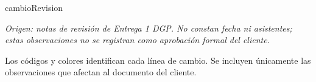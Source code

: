 \newpage
\begin{cambiocontenido}{cambioRevision}
\thispagestyle{empty}

\vspace{0.5em}
\par
\smallskip
{\small\textit{Origen: notas de revisión de Entrega 1 DGP. No constan fecha ni asistentes; estas observaciones no se registran como aprobación formal del cliente.}}\par
\smallskip
{\small Los códigos y colores identifican cada línea de cambio. Se incluyen únicamente las observaciones que afectan al documento del cliente.}\par


\end{cambiocontenido}
